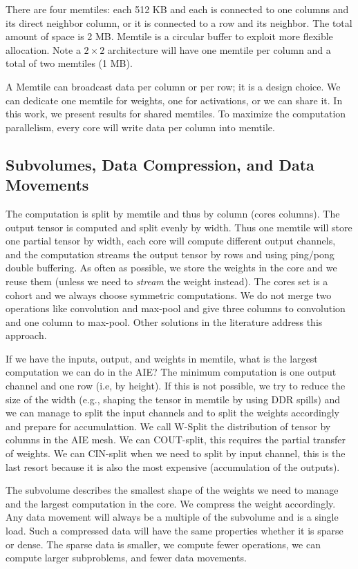 \documentclass[sigconf]{acmart}
\begin{document}
There are four memtiles: each 512 KB and each is connected to one
columns and its direct neighbor column, or it is connected to a row
and its neighbor. The total amount of space is 2 MB. Memtile is a
circular buffer to exploit more flexible allocation. Note a $2 \times
2$ architecture will have one memtile per column and a total of two
memtiles (1 MB).

A Memtile can broadcast data per column or per row; it is a design
choice. We can dedicate one memtile for weights, one for activations,
or we can share it. In this work, we present results for shared
memtiles. To maximize the computation parallelism, every core will
write data per column into memtile.


\subsection{Subvolumes, Data Compression, and Data Movements}
The computation is split by memtile and thus by column (cores
columns). The output tensor is computed and split evenly by
width. Thus one memtile will store one partial tensor by width, each
core will compute different output channels, and the computation
streams the output tensor by rows and using ping/pong double
buffering. As often as possible, we store the weights in the core and
we reuse them (unless we need to {\em stream} the weight instead). The
cores set is a cohort and we always choose symmetric computations. We
do not merge two operations like convolution and max-pool and give
three columns to convolution and one column to max-pool. Other
solutions in the literature address this approach.

If we have the inputs, output, and weights in memtile, what is the
largest computation we can do in the AIE? The minimum computation is
one output channel and one row (i.e, by height). If this is not
possible, we try to reduce the size of the width (e.g., shaping the
tensor in memtile by using DDR spills) and we can manage to split the
input channels and to split the weights accordingly and prepare for
accumulattion. We call W-Split the distribution of tensor by columns
in the AIE mesh. We can COUT-split, this requires the partial transfer
of weights.  We can CIN-split when we need to split by input channel,
this is the last resort because it is also the most expensive
(accumulation of the outputs).

The subvolume describes the smallest shape of the weights we need to
manage and the largest computation in the core. We compress the weight
accordingly. Any data movement will always be a multiple of the
subvolume and is a single load. Such a compressed data will have the
same properties whether it is sparse or dense. The sparse data is
smaller, we compute fewer operations, we can compute larger
subproblems, and fewer data movements.
\end{document}
